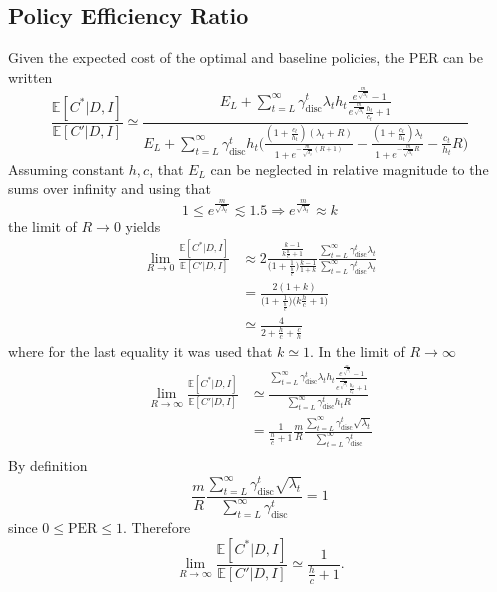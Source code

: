 \subsection{Policy Efficiency Ratio}
Given the expected cost of the optimal and baseline policies, the PER can be written
\begin{equation}
	\frac{\mathbb{E}[C^*|D,I] }{\mathbb{E}[C'|D,I]}\simeq \frac{E_L+\sum_{t=L}^{\infty} \gamma_{\text{disc}}^{t} \lambda_th_t\frac{e^{\frac{m}{\sqrt{\lambda_t}}}-1}{e^{\frac{m}{\sqrt{\lambda_t}}}\frac{h_t}{c_t}+1}}{E_L+\sum_{t=L}^{\infty} \gamma_{\text{disc}}^{t}h_t \bigg( 
		\frac{(1+\frac{c_t}{h_t})(\lambda_t+R)}{1+e^{-\frac{m}{\sqrt{\lambda_t}}(R+1)}}- \frac{(1+\frac{c_t}{h_t})\lambda_t}{1+e^{-\frac{m}{\sqrt{\lambda_t}}R}} - \frac{c_t}{h_t}R\bigg)}
\end{equation}
Assuming constant $h,c$, that $E_L$ can be neglected in relative magnitude to the sums over infinity and using that \begin{equation}
	1\leq e^{\frac{m}{\sqrt{\lambda_t}}}\lesssim 1.5 \Rightarrow  e^{\frac{m}{\sqrt{\lambda_t}}}\approx k
\end{equation}
the limit of $R\rightarrow 0$ yields
\begin{equation}
	\begin{split}
		\lim\limits_{R\rightarrow 0}\frac{\mathbb{E}[C^*|D,I]}{\mathbb{E}[C'|D,I]} 
		&\approx 2 \frac{\frac{k-1}{k\frac{h}{c} + 1}}{\big(1 + \frac{1}{\frac{h}{c}}\big)\frac{k-1}{1+k}} \frac{\sum_{t=L}^{\infty} \gamma_{\text{disc}}^{t} \lambda_t}{\sum_{t=L}^{\infty} \gamma_{\text{disc}}^{t} \lambda_t} \\
		&= \frac{2(1+k)}{\big(1 + \frac{1}{\frac{h}{c}}\big)\big(k\frac{h}{c} + 1\big)} \\
		&\simeq \frac{4}{2 + \frac{h}{c} + \frac{c}{h}}
	\end{split}
\end{equation}
where for the last equality it was used that $k\simeq 1$. In the limit of $R\rightarrow \infty$
\begin{equation}
	\begin{split}
		\lim\limits_{R\rightarrow \infty}\frac{\mathbb{E}[C^*|D,I] }{\mathbb{E}[C'|D,I]} &\simeq \frac{\sum_{t=L}^{\infty} \gamma_{\text{disc}}^{t} \lambda_th_t\frac{e^{\frac{m}{\sqrt{\lambda_t}}}-1}{e^{\frac{m}{\sqrt{\lambda_t}}}\frac{h_t}{c_t}+1}}{\sum_{t=L}^{\infty} \gamma_{\text{disc}}^{t}h_t R} \\
		&=\frac{1}{\frac{h}{c}+1} \frac{m}{R}\frac{\sum_{t=L}^{\infty} \gamma_{\text{disc}}^{t} \sqrt{\lambda_t}}{\sum_{t=L}^{\infty} \gamma_{\text{disc}}^{t}} \\
	\end{split}
\end{equation}
By definition
\begin{equation}
	\frac{m}{R}\frac{\sum_{t=L}^{\infty} \gamma_{\text{disc}}^{t} \sqrt{\lambda_t}}{\sum_{t=L}^{\infty} \gamma_{\text{disc}}^{t}} = 1 
\end{equation}
since $0\leq \text{PER}\leq 1$. Therefore
\begin{equation}
		\lim\limits_{R\rightarrow \infty}\frac{\mathbb{E}[C^*|D,I] }{\mathbb{E}[C'|D,I]} \simeq \frac{1}{\frac{h}{c}+1}.
\end{equation}
